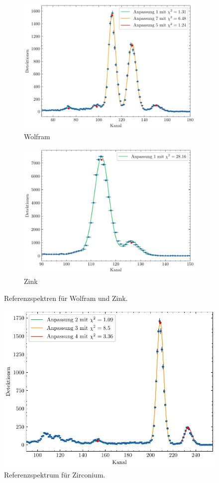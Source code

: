 \begin{figure}[H]
    \centering
    \begin{subfigure}{0.45\textwidth}
        \centering
        \includegraphics[width=\linewidth]{../figs/W}
        \caption{Wolfram}
    \end{subfigure}
    \begin{subfigure}{0.45\textwidth}
        \centering
        \includegraphics[width=\linewidth]{../figs/Zn}
        \caption{Zink}
    \end{subfigure}
    \caption{Referenzspektren für Wolfram und Zink.}\label{fig:w_zn}
\end{figure}
\begin{figure}[H]
	\centering
	\includegraphics[width=0.6\linewidth]{../figs/Zr.pdf}
	\caption{Referenzspektrum für Zirconium.}
	\label{fig:zr}
\end{figure}